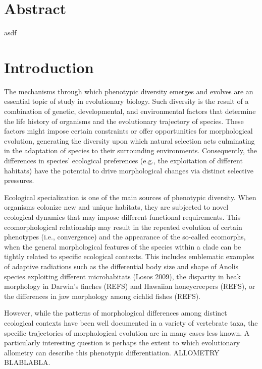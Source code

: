 \documentclass[
]{article}
\begin{document}
\newpage

\hypertarget{abstract}{%
\section{Abstract}\label{abstract}}

asdf

\newpage

\hypertarget{introduction}{%
\section{Introduction}\label{introduction}}

The mechanisms through which phenotypic diversity emerges and evolves
are an essential topic of study in evolutionary biology. Such diversity
is the result of a combination of genetic, developmental, and
environmental factors that determine the life history of organisms and
the evolutionary trajectory of species. These factors might impose
certain constraints or offer opportunities for morphological evolution,
generating the diversity upon which natural selection acts culminating
in the adaptation of species to their surrounding environments.
Consequently, the differences in species' ecological preferences (e.g.,
the exploitation of different habitats) have the potential to drive
morphological changes via distinct selective pressures. \hfill\break

Ecological specialization is one of the main sources of phenotypic
diversity. When organisms colonize new and unique habitats, they are
subjected to novel ecological dynamics that may impose different
functional requirements. This ecomorphological relationship may result
in the repeated evolution of certain phenotypes (i.e., convergence) and
the appearance of the so-called ecomorphs, when the general
morphological features of the species within a clade can be tightly
related to specific ecological contexts. This includes emblematic
examples of adaptive radiations such as the differential body size and
shape of Anolis species exploiting different microhabitats (Losos 2009),
the disparity in beak morphology in Darwin's finches (REFS) and Hawaiian
honeycreepers (REFS), or the differences in jaw morphology among cichlid
fishes (REFS). \hfill\break

However, while the patterns of morphological differences among distinct
ecological contexts have been well documented in a variety of vertebrate
taxa, the specific trajectories of morphological evolution are in many
cases less known. A particularly interesting question is perhaps the
extent to which evolutionary allometry can describe this phenotypic
differentiation. ALLOMETRY BLABLABLA. \hfill\break
\end{document}
